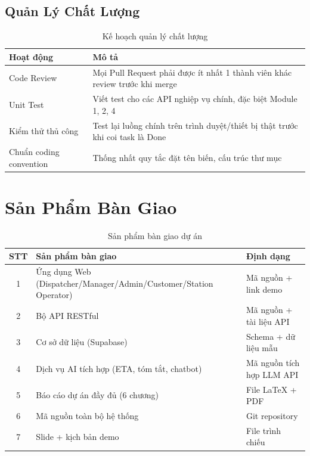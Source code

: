 \subsection{Quản Lý Chất Lượng}

\begin{table}[H]
  \centering
  \begin{tabularx}{\textwidth}{|l|X|}
    \hline
    \textbf{Hoạt động} & \textbf{Mô tả} \\
    \hline
    Code Review & Mọi Pull Request phải được ít nhất 1 thành viên khác review trước khi merge \\ \hline
    Unit Test & Viết test cho các API nghiệp vụ chính, đặc biệt Module 1, 2, 4 \\ \hline
    Kiểm thử thủ công & Test lại luồng chính trên trình duyệt/thiết bị thật trước khi coi task là Done \\ \hline
    Chuẩn coding convention & Thống nhất quy tắc đặt tên biến, cấu trúc thư mục\\
    \hline
  \end{tabularx}
  \caption{Kế hoạch quản lý chất lượng}
  \label{tab:quality_management}
\end{table}

\section{Sản Phẩm Bàn Giao}

\begin{table}[H]
  \centering
  \begin{tabularx}{\textwidth}{|c|X|l|}
    \hline
    \textbf{STT} & \textbf{Sản phẩm bàn giao} & \textbf{Định dạng} \\
    \hline
    1 & Ứng dụng Web (Dispatcher/Manager/Admin/\newline Customer/Station Operator) & Mã nguồn + link demo \\ \hline
    2 & Bộ API RESTful & Mã nguồn + tài liệu API \\ \hline
    3 & Cơ sở dữ liệu (Supabase) & Schema + dữ liệu mẫu \\ \hline
    4 & Dịch vụ AI tích hợp (ETA, tóm tắt, chatbot) & Mã nguồn tích hợp LLM API \\ \hline
    5 & Báo cáo dự án đầy đủ (6 chương) & File LaTeX + PDF \\ \hline
    6 & Mã nguồn toàn bộ hệ thống & Git repository \\ \hline
    7 & Slide + kịch bản demo & File trình chiếu \\
    \hline
  \end{tabularx}
  \caption{Sản phẩm bàn giao dự án}
  \label{tab:deliverables}
\end{table}

